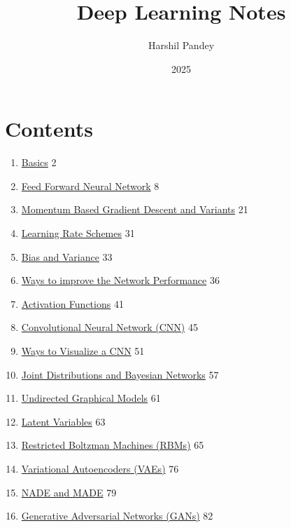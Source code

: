 \documentclass{article}
\title{Deep Learning Notes}
\author{Harshil Pandey}
\date{2025}
\begin{document}
\maketitle

\section*{Contents}
\begin{enumerate}
    \item \hyperlink{page.2}{Basics} \hfill 2
    \item \hyperlink{page.8}{Feed Forward Neural Network} \hfill 8
    \item \hyperlink{page.21}{Momentum Based Gradient Descent and Variants} \hfill 21
    \item \hyperlink{page.31}{Learning Rate Schemes} \hfill 31
    \item \hyperlink{page.33}{Bias and Variance} \hfill 33
    \item \hyperlink{page.36}{Ways to improve the Network Performance} \hfill 36
    \item \hyperlink{page.41}{Activation Functions} \hfill 41
    \item \hyperlink{page.45}{Convolutional Neural Network (CNN)} \hfill 45
    \item \hyperlink{page.51}{Ways to Visualize a CNN} \hfill 51
    \item \hyperlink{page.57}{Joint Distributions and Bayesian Networks} \hfill 57
    \item \hyperlink{page.61}{Undirected Graphical Models} \hfill 61
    \item \hyperlink{page.63}{Latent Variables} \hfill 63
    \item \hyperlink{page.65}{Restricted Boltzman Machines (RBMs)} \hfill 65
    \item \hyperlink{page.76}{Variational Autoencoders (VAEs)} \hfill 76
    \item \hyperlink{page.79}{NADE and MADE} \hfill 79
    \item \hyperlink{page.82}{Generative Adversarial Networks (GANs)} \hfill 82
    
    
    
\end{enumerate}




\end{document}

